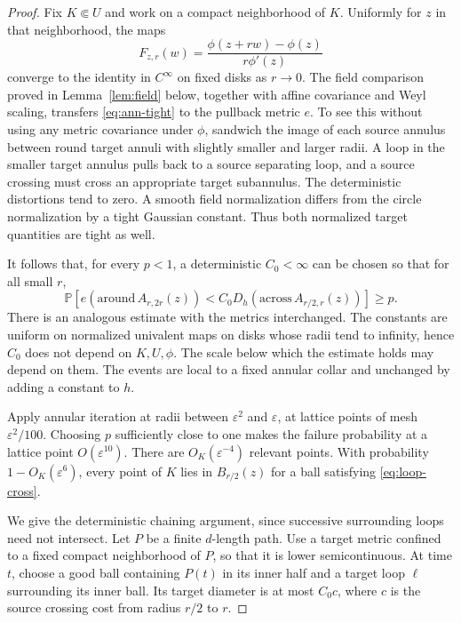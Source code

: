 \documentclass[11pt]{article}
\theoremstyle{definition}
\theoremstyle{remark}
\newcommand{\Pp}{\mathbb P}
\newcommand{\eps}{\varepsilon}
\begin{document}
\begin{proof}
Fix $K\Subset U$ and work on a compact neighborhood of $K$.
Uniformly for $z$ in that neighborhood, the maps
\[
 F_{z,r}(w)=\frac{\phi(z+rw)-\phi(z)}{r\phi'(z)}
\]
converge to the identity in $C^\infty$ on fixed disks as $r\to0$.
The field comparison proved in Lemma~\ref{lem:field} below, together
with affine covariance and Weyl scaling, transfers
\eqref{eq:ann-tight} to the pullback metric $e$. To see this without
using any metric covariance under $\phi$, sandwich the image of
each source annulus between round target annuli with slightly
smaller and larger radii. A loop in the smaller target annulus
pulls back to a source separating loop, and a source crossing must
cross an appropriate target subannulus. The deterministic
distortions tend to zero. A smooth field normalization differs
from the circle normalization by a tight Gaussian constant.
Thus both normalized target quantities are tight as well.

It follows that, for every $p<1$, a deterministic $C_0<\infty$
can be chosen so that for all small $r$,
\begin{equation}\label{eq:loop-cross}
 \Pp\left[e(\mathrm{around}\,A_{r,2r}(z))
       < C_0D_h(\mathrm{across}\,A_{r/2,r}(z))\right]\ge p.
\end{equation}
There is an analogous estimate with the metrics interchanged.
The constants are uniform on normalized univalent maps on disks
whose radii tend to infinity, hence $C_0$ does not depend on
$K,U,\phi$. The scale below which the estimate holds may depend
on them. The events are local to a fixed annular collar and
unchanged by adding a constant to $h$.

Apply annular iteration at radii between $\eps^2$ and $\eps$,
at lattice points of mesh $\eps^2/100$. Choosing $p$ sufficiently
close to one makes the failure probability at a lattice point
$O(\eps^{10})$. There are $O_K(\eps^{-4})$ relevant points.
With probability $1-O_K(\eps^6)$, every point of $K$ lies in
$B_{r/2}(z)$ for a ball satisfying \eqref{eq:loop-cross}.

We give the deterministic chaining argument, since successive
surrounding loops need not intersect. Let $P$ be a finite
$d$-length path. Use a target metric confined to a fixed compact
neighborhood of $P$, so that it is lower semicontinuous. At time
$t$, choose a good ball containing $P(t)$ in its inner half and
a target loop $\ell$ surrounding its inner ball. Its target
diameter is at most $C_0c$, where $c$ is the source crossing cost
from radius $r/2$ to $r$.


\end{proof}
\end{document}
